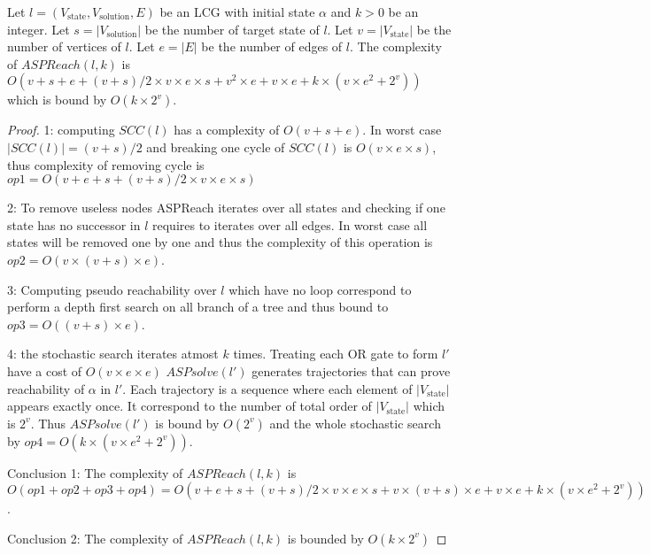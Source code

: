 \begin{theorem}
    Let $l=(V_{\mathrm{state}},V_{\mathrm{solution}}, E)$ be an LCG with initial state $\alpha$ and $k > 0$ be an integer.
    Let $s=|V_{\mathrm{solution}}|$ be the number of target state of $l$.
    Let $v = |V_{\mathrm{state}}|$ be the number of vertices of $l$.
    Let $e=|E|$ be the number of edges of $l$.
    The complexity of $ASPReach(l,k)$ is $O(v + s + e + (v+s) / 2 \times v \times e \times s + v^{2} \times e + v \times e + k \times (v \times e^{2} + 2^{v}))$ which is bound by $O(k \times 2^{v})$.
    \begin{proof}
    
        1: computing $SCC(l)$ has a complexity of $O(v + s + e)$.
        In worst case $|SCC(l)| = (v+s) / 2$ and breaking one cycle of $SCC(l)$ is $O(v \times e \times s)$, thus complexity of removing cycle is $op1=O(v+ e + s + (v+s) / 2 \times v \times e \times s)$
        
        2: To remove useless nodes ASPReach iterates over all states and checking if one state has no successor in $l$ requires to iterates over all edges.
        In worst case all states will be removed one by one and thus the complexity of this operation is $op2=O(v \times (v+s) \times e)$.
        
        3: Computing pseudo reachability over $l$ which have no loop correspond to perform a depth first search on all branch of a tree and thus bound to $op3=O((v+s) \times e)$.
        
        4: the stochastic search iterates atmost $k$ times.
        Treating each OR gate to form $l'$ have a cost of $O(v \times e \times e)$
        $ASPsolve(l')$ generates trajectories that can prove reachability of $\alpha$ in $l'$.
        Each trajectory is a sequence where each element of $|V_{\mathrm{state}}|$ appears exactly once.
        It correspond to the number of total order of $|V_{\mathrm{state}}|$ which is $2^{v}$.
        Thus $ASPsolve(l')$ is bound by $O(2^{v})$ and the whole stochastic search by $op4=O(k \times (v \times e^{2} + 2^{v}))$.
        
        Conclusion 1: The complexity of $ASPReach(l,k)$ is $O(op1 + op2 + op3 + op4) = O(v + e + s + (v+s) / 2  \times v \times e \times s + v \times (v+s) \times e + v \times e + k \times (v \times e^{2} + 2^{v}))$.
        
        Conclusion 2: The complexity of $ASPReach(l,k)$ is bounded by $O(k \times 2^{v})$
    \end{proof}
\end{theorem}

